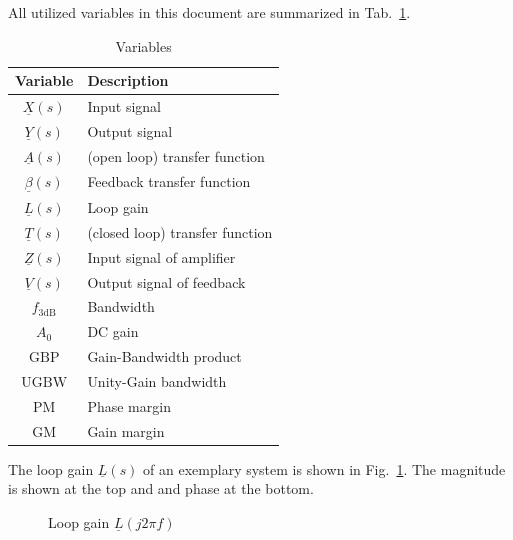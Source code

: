 \documentclass{article}[11pt]
\begin{document}
\medskip

All utilized variables in this document are summarized in 
Tab.~\ref{tab:variables}.

\begin{table}[H]
\centering
\caption{Variables}
\begin{tabular}{cl}
\toprule
\textbf{Variable}       & \textbf{Description}            \\ \midrule
$\underline{X}(s)$      & Input signal                    \\ 
$\underline{Y}(s)$      & Output signal                   \\
$\underline{A}(s)$      & (open loop) transfer function   \\
$\underline{\beta}(s)$  & Feedback transfer function      \\
$\underline{L}(s)$      & Loop gain                       \\
$\underline{T}(s)$      & (closed loop) transfer function \\
$\underline{Z}(s)$      & Input signal of amplifier       \\
$\underline{V}(s)$      & Output signal of feedback       \\
$f_{\mathrm{3dB}}$      & Bandwidth                       \\
$A_{\mathrm{0}}$        & DC gain                         \\
$\mathrm{GBP}$          & Gain-Bandwidth product          \\
$\mathrm{UGBW}$         & Unity-Gain bandwidth            \\
$\mathrm{PM}$           & Phase margin                    \\
$\mathrm{GM}$           & Gain margin                     \\ \toprule
\end{tabular}
\label{tab:variables}
\end{table}

The loop gain $\underline{L}(s)$ of an exemplary system is shown in 
Fig.~\ref{fig:ls}.
The magnitude is shown at the top and and phase at the bottom.

\begin{figure}[H]
  \centering
  \begin{tikzpicture}
    
  \end{tikzpicture}
  \caption{Loop gain $\underline{L}(j 2 \pi f)$}
  \label{fig:ls}
\end{figure}
\end{document}
